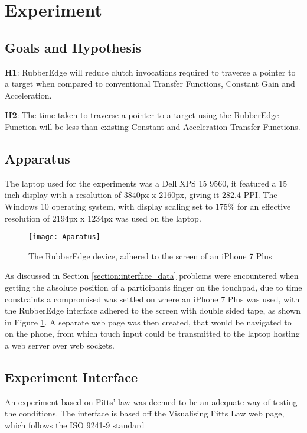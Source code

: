 \section{Experiment}

\subsection{Goals and Hypothesis}
\textbf{H1}: RubberEdge will reduce clutch invocations required to traverse a pointer to a target when compared to conventional Transfer Functions, Constant Gain and Acceleration.

\textbf{H2}: The time taken to traverse a pointer to a target using the RubberEdge Function will be less than existing Constant and Acceleration Transfer Functions.


\subsection{Apparatus}\label{section:apparatus}
The laptop used for the experiments was a Dell XPS 15 9560\cite{XPSZealand}, it featured a 15 inch display with a resolution of 3840px x 2160px, giving it 282.4 \gls{PPI}. The Windows 10 operating system, with display scaling set to 175\% for an effective resolution of 2194px x 1234px was used on the laptop.

\begin{figure}[h]
    \centering
    \texttt{[image: Aparatus]}
    \caption{The RubberEdge device, adhered to the screen of an iPhone 7 Plus}
    \label{fig:apparatus}
\end{figure}

As discussed in Section \ref{section:interface_data} problems were encountered when getting the absolute position of a participants finger on the touchpad, due to time constraints a compromised was settled on where an iPhone 7 Plus was used, with the RubberEdge interface adhered to the screen with double sided tape, as shown in Figure \ref{fig:apparatus}. A separate web page was then created, that would be navigated to on the phone, from which touch input could be transmitted to the laptop hosting a web server over web sockets.


\subsection{Experiment Interface}
An experiment based on Fitts' law was deemed to be an adequate way of testing the conditions. The interface is based off the Visualising Fitts Law\cite{Wallner2017AnD3} web page, which follows the ISO 9241-9 standard\cite{ISODevices}

